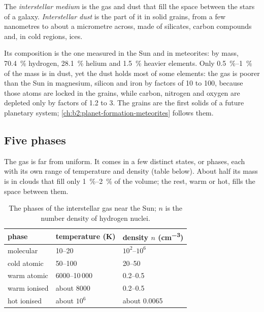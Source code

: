 \begin{definition}
\label{def:b2:ism-star-formation:ism}
The \emph{interstellar medium} is the gas and dust
that fill the space between the stars of a galaxy. \emph{Interstellar
dust} is the part of it in solid grains, from a few
nanometres to about a micrometre across, made of silicates, carbon compounds
and, in cold regions, ices.
\end{definition}

Its composition is the one measured in the Sun and in meteorites: by mass,
\qty{70.4}{\percent} hydrogen, \qty{28.1}{\percent} helium and
\qty{1.5}{\percent} heavier elements. Only \qtyrange{0.5}{1}{\percent} of the
mass is in dust, yet the dust holds most of some elements: the gas is poorer
than the Sun in magnesium, silicon and iron by factors of 10 to 100, because
those atoms are locked in the grains, while carbon, nitrogen and oxygen are
depleted only by factors of 1.2 to 3. The grains are the first solids of a
future planetary system; \cref{ch:b2:planet-formation-meteorites}
follows them.

\subsection{Five phases}

The gas is far from uniform. It comes in a few distinct states, or phases,
each with its own range of temperature and density (table below). About half
its mass is in clouds that fill only \qtyrange{1}{2}{\percent} of the volume;
the rest, warm or hot, fills the space between them.

\begin{table}[htbp]
\centering
\small
\begin{tabular}{lll}
\hline
phase & temperature (K) & density $n$ (\unit{cm^{-3}}) \\
\hline
molecular & 10--20 & $10^2$--$10^6$ \\
cold atomic & 50--100 & 20--50 \\
warm atomic & 6000--10\,000 & 0.2--0.5 \\
warm ionised & about 8000 & 0.2--0.5 \\
hot ionised & about $10^6$ & about 0.0065 \\
\hline
\end{tabular}
\caption{The phases of the interstellar gas near the Sun; $n$ is the number
density of hydrogen nuclei.}
\label{tab:b2:ism-star-formation:phases}
\end{table}

